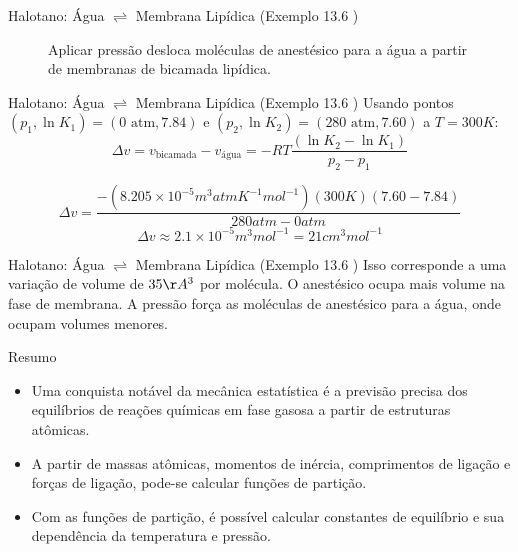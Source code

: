 \documentclass{beamer}
\begin{document}
\begin{frame}{Halotano: Água $\rightleftharpoons$ Membrana Lipídica (Exemplo 13.6 )}
        \begin{figure}
        \centering
        \caption{Aplicar pressão desloca moléculas de anestésico para a água a partir de membranas de bicamada lipídica.}
        \end{figure}
        
\end{frame}

\begin{frame}{Halotano: Água $\rightleftharpoons$ Membrana Lipídica (Exemplo 13.6 )}
        Usando pontos $(p_1, \ln K_1) = (0 \text{ atm}, 7.84)$ e $(p_2, \ln K_2) = (280 \text{ atm}, 7.60)$ a $T=300K$:
        $$ \Delta v = v_{\text{bicamada}} - v_{\text{água}} = -RT \frac{(\ln K_2 - \ln K_1)}{p_2 - p_1} $$
        
        $$ \Delta v = \frac{-(8.205 \times 10^{-5} m^3 atm K^{-1} mol^{-1})(300K)(7.60 - 7.84)}{280 atm - 0 atm} $$
        $$ \Delta v \approx 2.1 \times 10^{-5} m^3 mol^{-1} = 21 cm^3 mol^{-1} $$
        
\end{frame}

\begin{frame}{Halotano: Água $\rightleftharpoons$ Membrana Lipídica (Exemplo 13.6 )}
        Isso corresponde a uma variação de volume de $35 \AA^3$ por molécula. O anestésico ocupa mais volume na fase de membrana. A pressão força as moléculas de anestésico para a água, onde ocupam volumes menores.
\end{frame}

\begin{frame}{Resumo}
    \begin{itemize}
        \item Uma conquista notável da mecânica estatística é a previsão precisa dos equilíbrios de reações químicas em fase gasosa a partir de estruturas atômicas.
        \item A partir de massas atômicas, momentos de inércia, comprimentos de ligação e forças de ligação, pode-se calcular funções de partição.
        \item Com as funções de partição, é possível calcular constantes de equilíbrio e sua dependência da temperatura e pressão.
    \end{itemize}
\end{frame}

\end{document}
